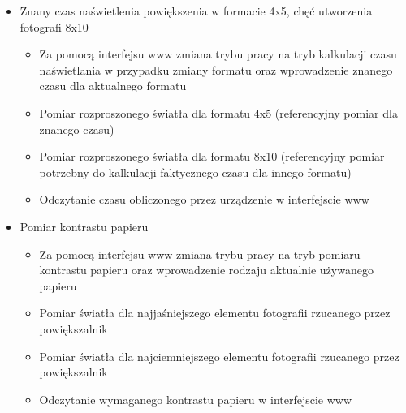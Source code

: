 \documentclass[12pt,a4paper]{article}
\begin{document}
\begin{itemize}
    \item Znany czas naświetlenia powiększenia w formacie 4x5, chęć utworzenia fotografi 8x10
    \begin{itemize}
        \item Za pomocą interfejsu www zmiana trybu pracy na tryb kalkulacji czasu naświetlania w przypadku zmiany formatu oraz wprowadzenie znanego czasu dla aktualnego formatu
        \item Pomiar rozproszonego światła dla formatu 4x5 (referencyjny pomiar dla znanego czasu)
        \item Pomiar rozproszonego światła dla formatu 8x10 (referencyjny pomiar potrzebny do kalkulacji faktycznego czasu dla innego formatu)
        \item Odczytanie czasu obliczonego przez urządzenie w interfejscie www
    \end{itemize}
    \item Pomiar kontrastu papieru
    \begin{itemize}
        \item Za pomocą interfejsu www zmiana trybu pracy na tryb pomiaru kontrastu papieru oraz wprowadzenie rodzaju aktualnie używanego papieru
        \item Pomiar światła dla najjaśniejszego elementu fotografii rzucanego przez powiększalnik
        \item Pomiar światła dla najciemniejszego elementu fotografii rzucanego przez powiększalnik
        \item Odczytanie wymaganego kontrastu papieru w interfejscie www
    \end{itemize}
\end{itemize}
\end{document}
